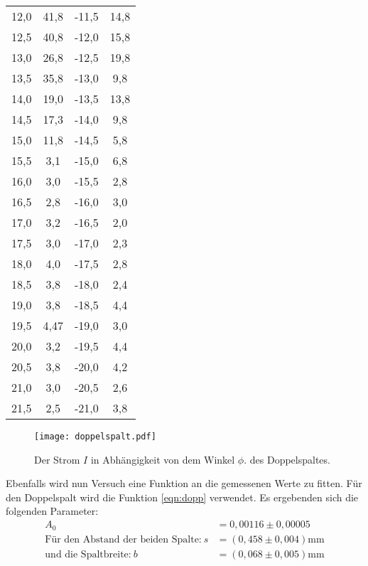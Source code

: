 \begin{table}
\begin{tabular}{c c c c}
    12,0 & 41,8  & -11,5 & 14,8 \\
    12,5 & 40,8  & -12,0 & 15,8 \\
    13,0 & 26,8  & -12,5 & 19,8 \\
    13,5 & 35,8  & -13,0 & 9,8 \\
    14,0 & 19,0  & -13,5 & 13,8 \\
    14,5 & 17,3  & -14,0 & 9,8  \\
    15,0 & 11,8  & -14,5 & 5,8  \\
    15,5 & 3,1   & -15,0 & 6,8  \\
    16,0 & 3,0   & -15,5 & 2,8  \\
    16,5 & 2,8   & -16,0 & 3,0  \\
    17,0 & 3,2   & -16,5 & 2,0  \\
    17,5 & 3,0   & -17,0 & 2,3  \\
    18,0 & 4,0   & -17,5 & 2,8  \\
    18,5 & 3,8   & -18,0 & 2,4  \\
    19,0 & 3,8   & -18,5 & 4,4  \\
    19,5 & 4,47  & -19,0 & 3,0  \\
    20,0 & 3,2   & -19,5 & 4,4  \\
    20,5 & 3,8   & -20,0 & 4,2  \\
    21,0 & 3,0   & -20,5 & 2,6  \\
    21,5 & 2,5   & -21,0 & 3,8  \\
    \bottomrule
    \end{tabular}
\end{table}
\FloatBarrier
\begin{figure}
  \centering
  \texttt{[image: doppelspalt.pdf]}
  \caption{ Der Strom $I$ in Abhängigkeit von dem Winkel $\phi$. des Doppelspaltes.}
  \label{fig:dopp}
\end{figure}
\FloatBarrier
Ebenfalls wird nun Versuch eine Funktion an die gemessenen Werte zu fitten.
Für den Doppelspalt wird die Funktion \eqref{eqn:dopp} verwendet.
Es ergebenden sich die folgenden
Parameter:
\begin{align*}
  A_0&=0,00116\pm0,00005\\
  \text{Für den Abstand der beiden Spalte:} \  s&=(0,458\pm0,004)\si{\milli\meter}\\
  \text{und die Spaltbreite:} \  b&=(0,068\pm0,005)\si{\milli\meter}\\
\end{align*}
